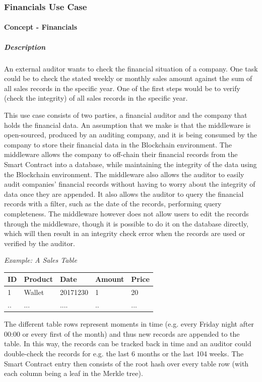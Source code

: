 \subsubsection{Financials Use Case}

\paragraph{Concept - Financials}
\subparagraph{Description}
An external auditor wants to check the financial situation of a company. One task could be to check the stated weekly or monthly sales amount against the sum of all sales records in the specific year. One of the first steps would be to verify (check the integrity) of all sales records in the specific year.

This use case consists of two parties, a financial auditor and the company that holds the financial data. An assumption that we make is that the middleware is open-sourced, produced by an auditing company, and it is being consumed by the company to store their financial data in the Blockchain environment. The middleware allows the company to off-chain their financial records from the Smart Contract into a database, while maintaining the integrity of the data using the Blockchain environment. The middleware also allows the auditor to easily audit companies’ financial records without having to worry about the integrity of data once they are appended. It also allows the auditor to query the financial records with a filter, such as the date of the records, performing query completeness. The middleware however does not allow users to edit the records through the middleware, though it is possible to do it on the database directly, which will then result in an integrity check error when the records are used or verified by the auditor.

\textit{Example: A Sales Table}
\begin{center}
    \begin{tabular}{| l | l | l | l | l |}
    \hline
    ID & Product & Date & Amount & Price \\ \hline
    1 & Wallet & 20171230 & 1 & 20 \\ \hline
    .. & ... & .... & .. & ... \\ \hline
    \end{tabular}
\end{center}

The different table rows represent moments in time (e.g. every Friday night after 00:00 or every first of the month) and thus new records are appended to the table. In this way, the records can be tracked back in time and an auditor could double-check the records for e.g. the last 6 months or the last 104 weeks. The Smart Contract entry then consists of the root hash over every table row (with each column being a leaf in the Merkle tree).

